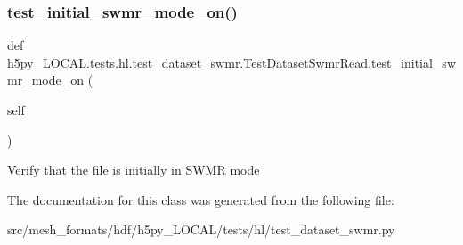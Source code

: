 \subsubsection{\texorpdfstring{test\+\_\+initial\+\_\+swmr\+\_\+mode\+\_\+on()}{test\_initial\_swmr\_mode\_on()}}
{\footnotesize\ttfamily def h5py\+\_\+\+L\+O\+C\+A\+L.\+tests.\+hl.\+test\+\_\+dataset\+\_\+swmr.\+Test\+Dataset\+Swmr\+Read.\+test\+\_\+initial\+\_\+swmr\+\_\+mode\+\_\+on (\begin{DoxyParamCaption}\item[{}]{self }\end{DoxyParamCaption})}

\begin{DoxyVerb}Verify that the file is initially in SWMR mode\end{DoxyVerb}
 

The documentation for this class was generated from the following file\+:\begin{DoxyCompactItemize}
\item 
src/mesh\+\_\+formats/hdf/h5py\+\_\+\+L\+O\+C\+A\+L/tests/hl/test\+\_\+dataset\+\_\+swmr.\+py\end{DoxyCompactItemize}
